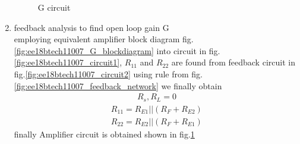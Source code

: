 \begin{enumerate}[label=\thesection.\arabic*.,ref=\thesection.\theenumi]
\begin{figure}[!ht]
\begin{center}
		\resizebox{\columnwidth}{!}{}
	\end{center}
\caption{G circuit}
\label{fig:ee18btech11007_circuit3}
\end{figure}





\item feedback analysis to find open loop gain G 
\\
\solution employing equivalent amplifier block diagram fig.\ref{fig:ee18btech11007_G_blockdiagram} into circuit in  fig.\ref{fig:ee18btech11007_circuit1}, $R_{11}$ and $R_{22}$ are found from feedback circuit in fig.\ref{fig:ee18btech11007_circuit2} using rule from fig.\ref{fig:ee18btech11007_feedback_network} we finally obtain
\begin{align}
    R_s,R_L=0
\end{align}
\begin{align}
    R_{11}=R_{E1}||(R_F+R_{E2})
\end{align}
\begin{align}
    R_{22}=R_{E2}||(R_F+R_{E1})
\end{align}
 finally Amplifier circuit is obtained shown in fig.\ref{fig:ee18btech11007_circuit3}
\begin{figure}[!ht]
	\begin{center}
		

\end{center}
\end{figure}
\end{enumerate}
